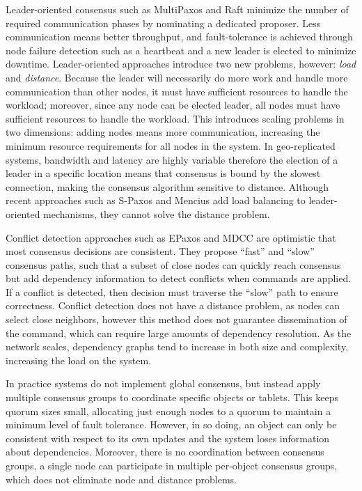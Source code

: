 \documentclass[11pt,letterpaper]{article}
\begin{document}
Leader-oriented consensus such as MultiPaxos \cite{lamport_paxos_2001} and Raft
\cite{ongaro_search_2014} minimize the number of required communication phases by
nominating a dedicated proposer.
Less communication means better throughput, and fault-tolerance is achieved through node
failure detection such as a heartbeat and a new leader is elected to minimize downtime.
Leader-oriented approaches introduce two new problems, however: \emph{load} and
\emph{distance}.
Because the leader will necessarily do more work and handle more communication than other
nodes, it must have sufficient resources to handle the workload; moreover, since any node
can be elected leader, all nodes must have sufficient resources to handle the workload.
This introduces scaling problems in two dimensions: adding nodes means more communication,
increasing the minimum resource requirements for all nodes in the system.
In geo-replicated systems, bandwidth and latency are highly variable therefore the
election of a leader in a specific location means that consensus is bound by the slowest
connection, making the consensus algorithm sensitive to distance.
Although recent approaches such as S-Paxos \cite{biely_s-paxos:_2012} and Mencius
\cite{mao_mencius:_2008} add load balancing to leader-oriented mechanisms, they cannot
solve the distance problem.

Conflict detection approaches such as EPaxos \cite{moraru_there_2013} and MDCC
\cite{kraska_mdcc:_2013} are optimistic that most consensus decisions are consistent.
They propose ``fast'' and ``slow'' consensus paths, such that a subset of close nodes can
quickly reach consensus but add dependency information to detect conflicts when commands
are applied.
If a conflict is detected, then decision must traverse the ``slow'' path to ensure
correctness.
Conflict detection does not have a distance problem, as nodes can select close neighbors,
however this method does not guarantee dissemination of the command, which can require
large amounts of dependency resolution.
As the network scales, dependency graphs tend to increase in both size and complexity,
increasing the load on the system.

In practice systems do not implement global consensus, but instead apply multiple
consensus groups to coordinate specific objects or tablets.
This keeps quorum sizes small, allocating just enough nodes to a quorum to maintain a
minimum level of fault tolerance.
However, in so doing, an object can only be consistent with respect to its own updates
and the system loses information about dependencies.
Moreover, there is no coordination between consensus groups, a single node can
participate in multiple per-object consensus groups, which does not eliminate node and
distance problems.
\end{document}
